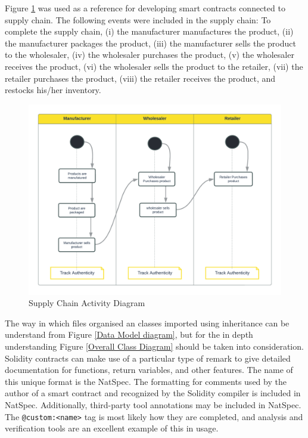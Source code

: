 \vspace{.5cm}

Figure \ref{Activity Diagram} was used as a reference for developing smart contracts connected to supply chain. The following events were included in the supply chain: To complete the supply chain, (i) the manufacturer manufactures the product, (ii) the manufacturer packages the product, (iii) the manufacturer sells the product to the wholesaler, (iv) the wholesaler purchases the product, (v) the wholesaler receives the product, (vi) the wholesaler sells the product to the retailer, (vii) the retailer purchases the product, (viii) the retailer receives the product, and restocks his/her inventory.

\vspace{.5cm}

\begin{figure}[h]
\centering
  \includegraphics[width=12cm]{includes/figures/Activity Diagram.png} 
  \caption{Supply Chain Activity Diagram}
  \label{Activity Diagram}
\end{figure}

\vspace{.5cm}

The way in which files organised an classes imported using inheritance can be understand from Figure \ref{Data Model diagram}, but for the in depth understanding Figure \ref{Overall Class Diagram} should be taken into consideration. Solidity contracts can make use of a particular type of remark to give detailed documentation for functions, return variables, and other features. The name of this unique format is the \ac{NatSpec}. The formatting for comments used by the author of a smart contract and recognized by the Solidity compiler is included in \ac{NatSpec}. Additionally, third-party tool annotations may be included in \ac{NatSpec}. The \texttt{@custom:<name>} tag is most likely how they are completed, and analysis and verification tools are an excellent example of this in usage.

